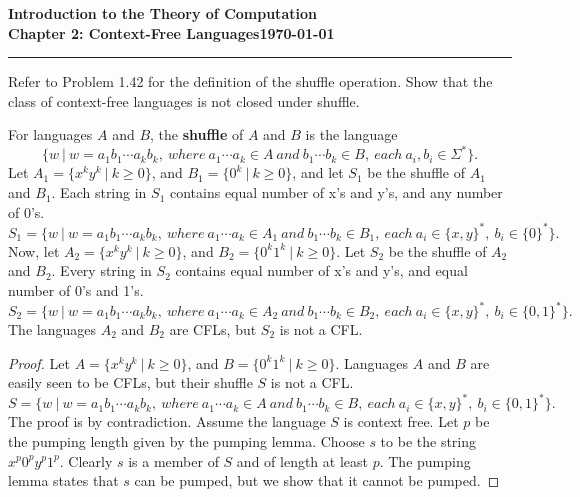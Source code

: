 \documentclass[11pt]{article}
\newcommand{\dated}{\today}
\begin{document}
\textbf{Introduction to the Theory of
Computation}\hfill\textbf{\myname}\\[0.01in]
\textbf{Chapter 2: Context-Free Languages}\hfill\textbf{\dated}\\
\smallskip\hrule\bigskip

\begin{problem}{2.39}
Refer to Problem 1.42 for the definition of the shuffle operation. Show that the class of context-free languages is not closed under shuffle.
\end{problem}

\begin{idea}
For languages $A$ and $B$, the \textbf{shuffle} of $A$ and $B$ is the language
\[
\{w \ | \ w = a_1b_1 \cdots a_kb_k, \ where \ a_1 \cdots a_k \in A \ and \ b_1 \cdots b_k \in B, \ each \ a_i, b_i \in \Sigma^*\}.
\]
Let $A_1 = \{x^ky^k \ | \ k \geq 0 \}$, and $B_1 = \{0^k \ | \ k \geq 0 \}$, and let $S_1$ be the shuffle of $A_1$ and $B_1$. Each string in $S_1$ contains equal number of x's and y's, and any number of 0's.
\[
S_1 = \{w \ | \ w = a_1b_1 \cdots a_kb_k, \ where \ a_1 \cdots a_k \in A_1 \ and \ b_1 \cdots b_k \in B_1, \ each \ a_i \in \{x,y\}^*, \ b_i \in \{0\}^*\}.
\]
Now, let $A_2 = \{x^ky^k \ | \ k \geq 0 \}$, and $B_2 = \{0^k1^k \ | \ k \geq 0 \}$. Let $S_2$ be the shuffle of $A_2$ and $B_2$. Every string in $S_2$ contains equal number of x's and y's, and equal number of 0's and 1's.
\[
S_2 = \{w \ | \ w = a_1b_1 \cdots a_kb_k, \ where \ a_1 \cdots a_k \in A_2 \ and \ b_1 \cdots b_k \in B_2, \ each \ a_i \in \{x,y\}^*, \ b_i \in \{0, 1\}^*\}.
\]
The languages $A_2$ and $B_2$ are CFLs, but $S_2$ is not a CFL.
\end{idea}

\begin{proof}
Let $A = \{x^ky^k \ | \ k \geq 0 \}$, and $B = \{0^k1^k \ | \ k \geq 0 \}$. Languages $A$ and $B$ are easily seen to be CFLs, but their shuffle $S$ is not a CFL.
\[
S = \{w \ | \ w = a_1b_1 \cdots a_kb_k, \ where \ a_1 \cdots a_k \in A \ and \ b_1 \cdots b_k \in B, \ each \ a_i \in \{x,y\}^*, \ b_i \in \{0, 1\}^*\}.
\]
The proof is by contradiction. Assume the language $S$ is context free. Let $p$ be the pumping length given by the pumping lemma. Choose $s$ to be the string $x^p0^py^p1^p$. Clearly $s$ is a member of $S$ and of length at least $p$. The pumping lemma states that $s$ can be pumped, but we show that it cannot be pumped.
\end{proof}
\end{document}
